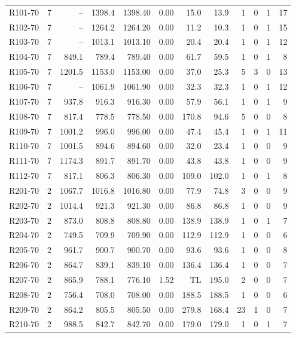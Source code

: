 \documentclass[10pt]{article}
\begin{document}
\begin{table}[p]
\begin{tabular}{lrrrrrrrrrrr}
\midrule
R101-70 & 7 & -- & 1398.4 & 1398.40 & 0.00 & 15.0 & 13.9 & 1 & 0 & 1 & 17 \\
R102-70 & 7 & -- & 1264.2 & 1264.20 & 0.00 & 11.2 & 10.3 & 1 & 0 & 1 & 15 \\
R103-70 & 7 & -- & 1013.1 & 1013.10 & 0.00 & 20.4 & 20.4 & 1 & 0 & 1 & 12 \\
R104-70 & 7 & 849.1 & 789.4 & 789.40 & 0.00 & 61.7 & 59.5 & 1 & 0 & 1 & 8 \\
R105-70 & 7 & 1201.5 & 1153.0 & 1153.00 & 0.00 & 37.0 & 25.3 & 5 & 3 & 0 & 13 \\
R106-70 & 7 & -- & 1061.9 & 1061.90 & 0.00 & 32.3 & 32.3 & 1 & 0 & 1 & 12 \\
R107-70 & 7 & 937.8 & 916.3 & 916.30 & 0.00 & 57.9 & 56.1 & 1 & 0 & 1 & 9 \\
R108-70 & 7 & 817.4 & 778.5 & 778.50 & 0.00 & 170.8 & 94.6 & 5 & 0 & 0 & 8 \\
R109-70 & 7 & 1001.2 & 996.0 & 996.00 & 0.00 & 47.4 & 45.4 & 1 & 0 & 1 & 11 \\
R110-70 & 7 & 1001.5 & 894.6 & 894.60 & 0.00 & 32.0 & 23.4 & 1 & 0 & 0 & 9 \\
R111-70 & 7 & 1174.3 & 891.7 & 891.70 & 0.00 & 43.8 & 43.8 & 1 & 0 & 0 & 9 \\
R112-70 & 7 & 817.1 & 806.3 & 806.30 & 0.00 & 109.0 & 102.0 & 1 & 0 & 1 & 8 \\
\midrule
R201-70 & 2 & 1067.7 & 1016.8 & 1016.80 & 0.00 & 77.9 & 74.8 & 3 & 0 & 0 & 9 \\
R202-70 & 2 & 1014.4 & 921.3 & 921.30 & 0.00 & 86.8 & 86.8 & 1 & 0 & 0 & 9 \\
R203-70 & 2 & 873.0 & 808.8 & 808.80 & 0.00 & 138.9 & 138.9 & 1 & 0 & 1 & 7 \\
R204-70 & 2 & 749.5 & 709.9 & 709.90 & 0.00 & 112.9 & 112.9 & 1 & 0 & 0 & 6 \\
R205-70 & 2 & 961.7 & 900.7 & 900.70 & 0.00 & 93.6 & 93.6 & 1 & 0 & 0 & 8 \\
R206-70 & 2 & 864.7 & 839.1 & 839.10 & 0.00 & 136.4 & 136.4 & 1 & 0 & 0 & 7 \\
R207-70 & 2 & 865.9 & 788.1 & 776.10 & 1.52 & TL & 195.0 & 2 & 0 & 0 & 7 \\
R208-70 & 2 & 756.4 & 708.0 & 708.00 & 0.00 & 188.5 & 188.5 & 1 & 0 & 0 & 6 \\
R209-70 & 2 & 864.2 & 805.5 & 805.50 & 0.00 & 279.8 & 168.4 & 23 & 1 & 0 & 7 \\
R210-70 & 2 & 988.5 & 842.7 & 842.70 & 0.00 & 179.0 & 179.0 & 1 & 0 & 1 & 7 \\

\end{tabular}
\end{table}
\end{document}

